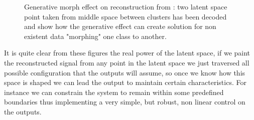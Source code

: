 \begin{figure}
    \centering
    \caption{Generative morph effect on reconstruction from : two latent space point taken from middle space between clusters has been decoded and show how the generative effect can create solution for non existent data "morphing" one class to another. } 
    \label{fig:step1_morph}
\end{figure}
It is quite clear from these figures the real power of the latent space, if we paint the reconstructed signal from any point in the latent space we just traversed all possible configuration that the outputs will assume, so once we know how this space is shaped we can lead the output to maintain certain characteristics. For instance we can constrain the system to remain within some predefined boundaries thus implementing a very simple, but robust, non linear control on the outputs.

